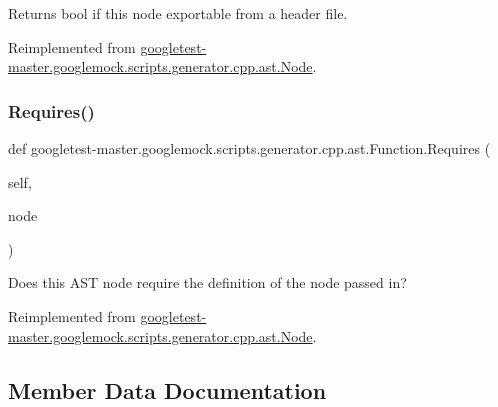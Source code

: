 \begin{DoxyVerb}Returns bool if this node exportable from a header file.\end{DoxyVerb}
 

Reimplemented from \mbox{\hyperlink{classgoogletest-master_1_1googlemock_1_1scripts_1_1generator_1_1cpp_1_1ast_1_1_node_a84e05fc36f3b1f650b0aad690ef91c3a}{googletest-\/master.\+googlemock.\+scripts.\+generator.\+cpp.\+ast.\+Node}}.

\mbox{\label{classgoogletest-master_1_1googlemock_1_1scripts_1_1generator_1_1cpp_1_1ast_1_1_function_a35a115a6c0454c916a89e77298fa921d}} 
\subsubsection{\texorpdfstring{Requires()}{Requires()}}
{\footnotesize\ttfamily def googletest-\/master.\+googlemock.\+scripts.\+generator.\+cpp.\+ast.\+Function.\+Requires (\begin{DoxyParamCaption}\item[{}]{self,  }\item[{}]{node }\end{DoxyParamCaption})}

\begin{DoxyVerb}Does this AST node require the definition of the node passed in?\end{DoxyVerb}
 

Reimplemented from \mbox{\hyperlink{classgoogletest-master_1_1googlemock_1_1scripts_1_1generator_1_1cpp_1_1ast_1_1_node_a2e88d3bf96b19fe72c26eec93e104381}{googletest-\/master.\+googlemock.\+scripts.\+generator.\+cpp.\+ast.\+Node}}.



\subsection{Member Data Documentation}
\mbox{\label{classgoogletest-master_1_1googlemock_1_1scripts_1_1generator_1_1cpp_1_1ast_1_1_function_a21777a3e5688e715c06b7cf4e9cf19b9}} 
